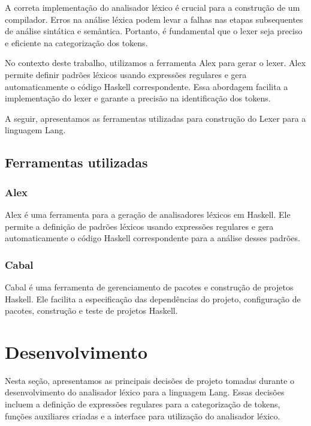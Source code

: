 \documentclass{article}
\begin{document}
A correta implementação do analisador léxico é crucial para a construção de um compilador. Erros na análise léxica podem levar a falhas nas etapas subsequentes de análise sintática e semântica. Portanto, é fundamental que o lexer seja preciso e eficiente na categorização dos tokens.

No contexto deste trabalho, utilizamos a ferramenta Alex para gerar o lexer. Alex permite definir padrões léxicos usando expressões regulares e gera automaticamente o código Haskell correspondente. Essa abordagem facilita a implementação do lexer e garante a precisão na identificação dos tokens.

A seguir, apresentamos as ferramentas utilizadas para construção do Lexer para a linguagem Lang.

\subsection{Ferramentas utilizadas}
\subsubsection{Alex}
Alex é uma ferramenta para a geração de analisadores léxicos em Haskell. Ele permite a definição de padrões léxicos usando expressões regulares e gera automaticamente o código Haskell correspondente para a análise desses padrões.

\subsubsection{Cabal}
Cabal é uma ferramenta de gerenciamento de pacotes e construção de projetos Haskell. Ele facilita a especificação das dependências do projeto, configuração de pacotes, construção e teste de projetos Haskell.

\section{Desenvolvimento}
Nesta seção, apresentamos as principais decisões de projeto tomadas durante o desenvolvimento do analisador léxico para a linguagem Lang. Essas decisões incluem a definição de expressões regulares para a categorização de tokens, funções auxiliares criadas e a interface para utilização do analisador léxico.
\end{document}
